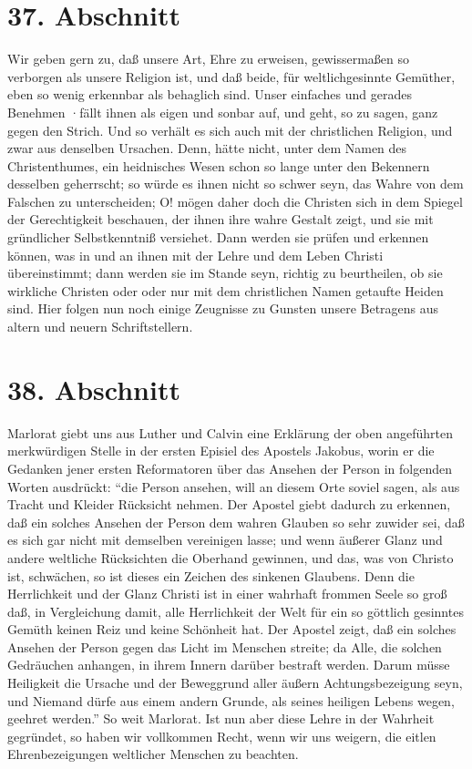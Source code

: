 \section{37. Abschnitt} \label{kap9_ab37}

Wir geben gern zu, daß unsere Art, Ehre zu erweisen, gewissermaßen so verborgen
als unsere Religion ist, und daß beide, für weltlichgesinnte Gemüther, eben so
wenig erkennbar als behaglich sind. Unser einfaches und gerades Benehmen ·fällt
ihnen als eigen und sonbar auf, und geht, so zu sagen, ganz gegen den Strich.
Und so verhält es sich auch mit der christlichen Religion, und zwar aus
denselben Ursachen. Denn, hätte nicht, unter dem Namen des Christenthumes, ein
heidnisches Wesen schon so lange unter den Bekennern desselben geherrscht; so
würde es ihnen nicht so schwer seyn, das Wahre von dem Falschen zu
unterscheiden; O! mögen daher doch die Christen sich in dem Spiegel der
Gerechtigkeit beschauen, der ihnen ihre wahre Gestalt zeigt, und sie mit
gründlicher Selbstkenntniß versiehet. Dann werden sie prüfen und erkennen
können, was in und an ihnen mit der Lehre und dem Leben Christi übereinstimmt;
dann werden sie im Stande seyn, richtig zu beurtheilen, ob sie wirkliche
Christen oder oder nur mit dem christlichen Namen getaufte Heiden sind. Hier
folgen nun noch einige Zeugnisse zu Gunsten unsere Betragens aus altern und
neuern Schriftstellern.

\section{38. Abschnitt} \label{kap9_ab38}

Marlorat giebt uns aus Luther und Calvin eine Erklärung der oben angeführten
merkwürdigen Stelle in der ersten Episiel des Apostels Jakobus, worin er die
Gedanken jener ersten Reformatoren über das Ansehen der Person in folgenden
Worten ausdrückt: "`die Person ansehen, will an diesem Orte soviel sagen, als
aus Tracht und Kleider Rücksicht nehmen. Der Apostel giebt dadurch zu erkennen,
daß ein solches Ansehen der Person dem wahren Glauben so sehr zuwider sei, daß
es sich gar nicht mit demselben vereinigen lasse; und wenn äußerer Glanz und
andere weltliche Rücksichten die Oberhand gewinnen, und das, was von Christo
ist, schwächen, so ist dieses ein Zeichen des sinkenen Glaubens. Denn die
Herrlichkeit und der Glanz Christi ist in einer wahrhaft frommen Seele so groß
daß, in Vergleichung damit, alle Herrlichkeit der Welt für ein so göttlich
gesinntes Gemüth keinen Reiz und keine Schönheit hat. Der Apostel zeigt, daß ein
solches Ansehen der Person gegen das Licht im Menschen streite; da Alle, die
solchen Gedräuchen anhangen, in ihrem Innern darüber bestraft werden. Darum
müsse Heiligkeit die Ursache und der Beweggrund aller äußern Achtungsbezeigung
seyn, und Niemand dürfe aus einem andern Grunde, als seines heiligen Lebens
wegen, geehret werden."' So weit Marlorat. Ist nun aber diese Lehre in der
Wahrheit gegründet, so haben wir vollkommen Recht, wenn wir uns weigern, die
eitlen Ehrenbezeigungen weltlicher Menschen zu beachten.

